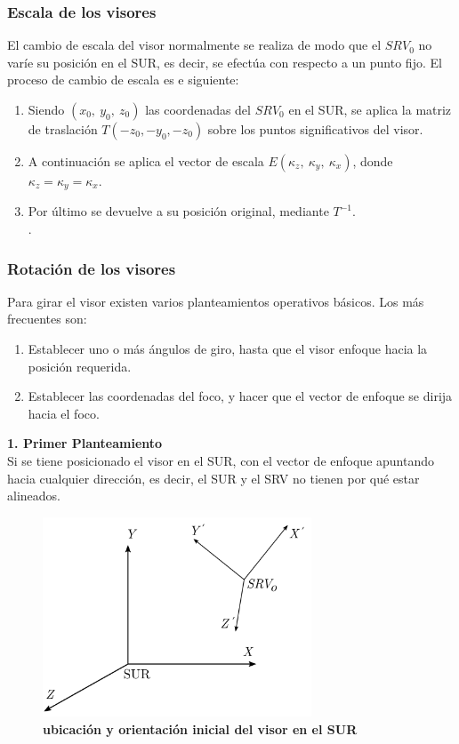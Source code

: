 \subsubsection{Escala de los visores}
El cambio de escala del visor normalmente se realiza de modo que el $SRV_0$ no varíe su posición en el SUR, es decir, se efectúa con respecto a un punto fijo. El proceso de cambio de escala es e siguiente:
\begin{enumerate}
    \item Siendo $(x_0, \ y_0, \ z_0)$ las coordenadas del $SRV_0$ en el SUR, se aplica la matriz de traslación $T(-z_0, -y_0, -z_0)$ sobre los puntos significativos del visor.
    \item A continuación se aplica el vector de escala $E(\kappa_z, \ \kappa_y, \ \kappa_x)$, donde $\kappa_z = \kappa_y = \kappa_x$.
    \item Por último se devuelve a su posición original, mediante $T^{-1}$. \\
     \citep{Ramos2011}.
\end{enumerate}

\subsubsection{Rotación de los visores}
Para girar el visor existen varios planteamientos operativos básicos. Los más frecuentes son:
\begin{enumerate}
\item Establecer uno o más ángulos de giro, hasta que el visor enfoque hacia la posición requerida.
\item Establecer las coordenadas del foco, y hacer que el vector de enfoque se dirija hacia el foco.
\end{enumerate}

\textbf{1. Primer Planteamiento}\\
Si se tiene posicionado el visor en el SUR, con el vector de enfoque apuntando hacia cualquier dirección, es decir, el SUR y el SRV no tienen por qué estar alineados.

\begin{figure}[h]
\includegraphics[width=8cm]{Img/GEO/geo-visor-5.png}
\centering
    \caption{\footnotesize{\textbf{ubicación y orientación inicial del visor en el SUR}}}
    \label{geo-visor5}
\end{figure}


